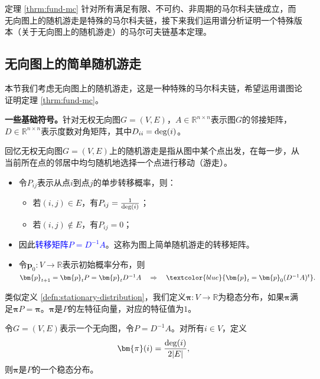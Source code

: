 \documentclass[lang=cn,newtx,10pt,scheme=chinese,chinesefont=nofont,citestyle=gb7714-2015, bibstyle=gb7714-2015]{elegantbook}
\begin{document}
\begin{refsection}
    定理 \ref{thrm:fund-mc} 针对所有满足有限、不可约、非周期的马尔科夫链成立，而无向图上的随机游走是特殊的马尔科夫链，接下来我们运用谱分析证明一个特殊版本（关于无向图上的随机游走）的马尔可夫链基本定理。


        
\subsection{无向图上的简单随机游走}
        
本节我们考虑无向图上的随机游走，这是一种特殊的马尔科夫链，希望运用谱图论证明定理 \ref{thrm:fund-mc}。

\textbf{一些基础符号。}针对无权无向图$G=(V,E)$，$A\in\mathbb{R}^{n\times n}$表示图$G$的邻接矩阵，$D\in\mathbb{R}^{n\times n}$表示度数对角矩阵，其中$D_{ii}=\textup{deg}(i)$。

\vspace{0.2cm}
回忆无权无向图$G=(V,E)$上的随机游走是指从图中某个点出发，在每一步，从当前所在点的邻居中均匀随机地选择一个点进行移动（游走）。
        
\begin{itemize}
    \item 令$P_{ij}$表示从点$i$到点$j$的单步转移概率，则：
    \begin{itemize}
        \item 若$(i,j)\in E$，有$P_{ij}=\frac{1}{\textup{deg}(i)}$；
        \item 若$(i,j)\notin E$，有$P_{ij}=0$；
    \end{itemize}
    \item 因此\textcolor{blue}{转移矩阵$P=D^{-1}A$}。这称为图上简单随机游走的转移矩阵。
    \item 令$\bm{p}_0:V\rightarrow \mathbb{R}$表示初始概率分布，则$\bm{p}_{t+1} = \bm{p}_t P= \bm{p}_t D^{-1}A
        \quad \Rightarrow \quad
        \textcolor{blue}{\bm{p}_t = \bm{p}_0 (D^{-1}A)^t}.$
\end{itemize}

\vspace{0.2cm}
类似定义 \ref{defn:stationary-distribution}，我们定义$\bm{\pi}:V\to \mathbb{R}$为稳态分布，如果$\bm{\pi}$满足$\bm{\pi}P=\bm{\pi}$。$\bm{\pi}$是$P$的左特征向量，对应的特征值为$1$。%

\begin{lemma}
    \label{lemma:sta-dist-graoh}
    令$G=(V,E)$表示一个无向图，令$P=D^{-1}A$。对所有$i\in V$，定义
    \[
        \bm{\pi}(i)=\frac{\textup{deg}(i)}{2|E|},
    \]
    则$\bm{\pi}$是$P$的一个稳态分布。
            

\end{lemma}
\end{refsection}
\end{document}
